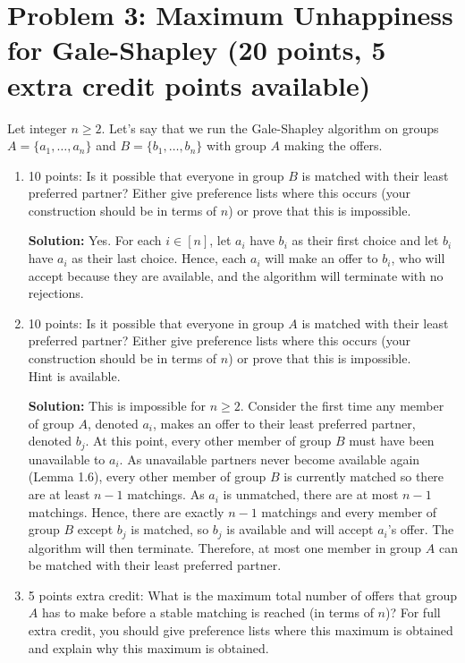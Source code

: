 \documentclass[12pt]{article}
\begin{document}
\section*{Problem 3: Maximum Unhappiness for Gale-Shapley (20 points, 5 extra credit points available)}
Let integer $n\geq 2$. Let's say that we run the Gale-Shapley algorithm on groups $A=\{a_1,\ldots,a_n\}$ and $B=\{b_1,\ldots,b_n\}$ with group $A$ making the offers.
\begin{enumerate}
\item[(a)] 10 points: Is it possible that everyone in group $B$ is matched with their least preferred partner? Either give preference lists where this occurs (your construction should be in terms of $n$) or prove that this is impossible.

\textbf{Solution:} Yes. For each $i\in[n]$, let $a_i$ have $b_i$ as their first choice and let $b_i$ have $a_i$ as their last choice. Hence, each $a_i$ will make an offer to $b_i$, who will accept because they are available, and the algorithm will terminate with no rejections.

\item[(b)] 10 points: Is it possible that everyone in group $A$ is matched with their least preferred partner? Either give preference lists where this occurs (your construction should be in terms of $n$) or prove that this is impossible.\\
Hint is available.

\textbf{Solution:} This is impossible for $n\geq 2$. Consider the first time any member of group $A$, denoted $a_i$, makes an offer to their least preferred partner, denoted $b_j$. At this point, every other member of group $B$ must have been unavailable to $a_i$. As unavailable partners never become available again (Lemma 1.6), every other member of group $B$ is currently matched so there are at least $n-1$ matchings. As $a_i$ is unmatched, there are at most $n-1$ matchings. Hence, there are exactly $n-1$ matchings and every member of group $B$ except $b_j$ is matched, so $b_j$ is available and will accept $a_i$'s offer. The algorithm will then terminate. Therefore, at most one member in group $A$ can be matched with their least preferred partner.

\item[(c)] 5 points extra credit: What is the maximum total number of offers that group $A$ has to make before a stable matching is reached (in terms of $n$)? For full extra credit, you should give preference lists where this maximum is obtained and explain why this maximum is obtained.


\end{enumerate}
\end{document}
